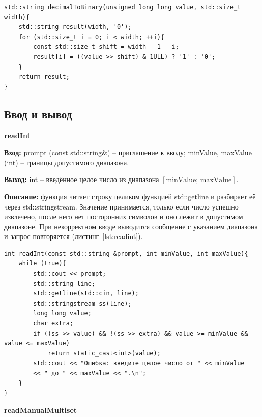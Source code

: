 \documentclass[14pt,a4paper]{extreport}
\newcommand{\code}[1]{{\ttfamily #1}}
\begin{document}
\begin{listing}[H]
\caption{Функция \code{decimalToBinary} (gray\_code.cpp)}\label{lst:decToBin}
\begin{lstlisting}
std::string decimalToBinary(unsigned long long value, std::size_t width){
    std::string result(width, '0');
    for (std::size_t i = 0; i < width; ++i){
        const std::size_t shift = width - 1 - i;
        result[i] = ((value >> shift) & 1ULL) ? '1' : '0';
    }
    return result;
}
\end{lstlisting}
\end{listing}

\subsection{Ввод и вывод}

\textbf{readInt}

\textbf{Вход:} \code{prompt} (\code{const std::string\&}) -- приглашение к вводу; \code{minValue}, \code{maxValue} (\code{int}) -- границы допустимого диапазона.

\textbf{Выход:} \code{int} -- введённое целое число из диапазона $[\text{minValue};\,\text{maxValue}]$.

\textbf{Описание:} функция читает строку целиком функцией \code{std::getline} и разбирает её через \code{std::stringstream}. Значение принимается, только если число успешно извлечено, после него нет посторонних символов и оно лежит в допустимом диапазоне. При некорректном вводе выводится сообщение с указанием диапазона и запрос повторяется (листинг~\ref{lst:readint}).

\begin{listing}[H]
\caption{Функция \code{readInt} (input.cpp)}\label{lst:readint}
\begin{lstlisting}
int readInt(const std::string &prompt, int minValue, int maxValue){
    while (true){
        std::cout << prompt;
        std::string line;
        std::getline(std::cin, line);
        std::stringstream ss(line);
        long long value;
        char extra;
        if ((ss >> value) && !(ss >> extra) && value >= minValue && value <= maxValue)
            return static_cast<int>(value);
        std::cout << "Ошибка: введите целое число от " << minValue 
        << " до " << maxValue << ".\n";
    }
}
\end{lstlisting}
\end{listing}

\textbf{readManualMultiset}
\end{document}
